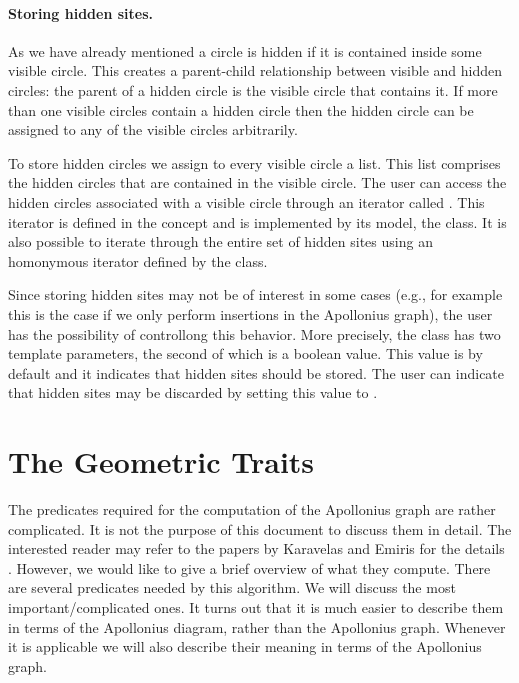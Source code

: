 {\paragraph{Storing hidden sites.}
As we have already mentioned a circle is hidden if it is contained
inside some visible circle. This creates a parent-child relationship
between visible and hidden circles: the parent of a hidden circle is the
visible circle that contains it. If more than one visible circles
contain a hidden circle then the hidden circle can be assigned to any of
the visible circles arbitrarily.

To store hidden circles we assign to every visible circle a list. This
list comprises the hidden circles that are contained in the
visible circle. The user can access the hidden circles associated with
a visible circle through an iterator called
. This iterator is defined in the
 concept and is implemented by its
model, the 
class. It is also possible to iterate through the entire set of hidden
sites using an homonymous iterator defined by the
 class. 

Since storing hidden sites may not be of interest in some cases (e.g.,
for example this is the case if we only perform insertions in the
Apollonius graph), the user has the possibility of controllong this
behavior. More precisely, the class
 has two template
parameters, the second of which is a boolean value. This value is by
default  and it indicates that hidden sites should be
stored. The user can indicate that hidden sites may be discarded
by setting this value to .


\section{The Geometric Traits}
\label{sec:apollonius2-traits}

The predicates required for the computation of the Apollonius graph
are rather complicated. It is not the purpose of this document to
discuss them in detail. The interested reader may refer to the papers
by Karavelas and Emiris for the details
\cite{cgal:ke-ppawv-02,ke-rctac-03}. However, we would like to give a brief
overview of what they 
compute. There are several predicates needed by this algorithm. We
will discuss the most important/complicated ones. It turns out that
it is much easier to describe them in terms of the Apollonius diagram,
rather than the Apollonius graph. Whenever it is applicable we will also
describe their meaning in terms of the Apollonius graph.


}
